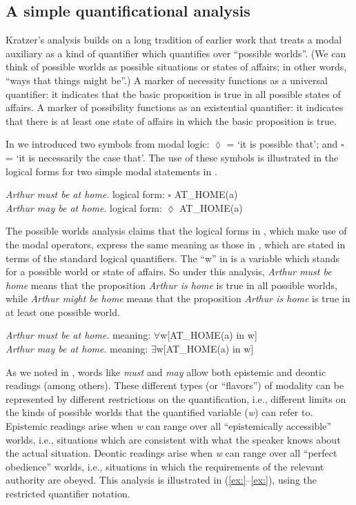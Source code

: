 \subsection{A simple quantificational analysis}\label{sec:16.3.1}

Kratzer’s analysis builds on a long tradition of earlier work that treats a modal auxiliary as a kind of quantifier which quantifies over “possible worlds”. (We can think of possible worlds as possible situations or states of affairs; in other words, “ways that things might be”.) A marker of necessity functions as a universal quantifier: it indicates that the basic proposition is true in all possible states of affairs. A marker of possibility functions as an existential quantifier: it indicates that there is at least one state of affairs in which the basic proposition is true.



In  we introduced two symbols from modal logic: ${\lozenge}$ = ‘it is possible that’; and ${\square}$ = ‘it is necessarily the case that’. The use of these symbols is illustrated in the logical forms for two simple modal statements in .


\ea
\ea \textit{Arthur must be at home}.  logical form: ${\square}$ AT\_HOME(a)\\
\ex \textit{Arthur may be at home}.  logical form: ${\lozenge}$ AT\_HOME(a)
                       \z
\z


The possible worlds analysis claims that the logical forms in , which make use of the modal operators, express the same meaning as those in , which are stated in terms of the standard logical quantifiers. The “w” in  is a variable which stands for a possible world or state of affairs. So under this analysis, \textit{Arthur must be home} means that the proposition \textit{Arthur is home} is true in all possible worlds, while \textit{Arthur might be home} means that the proposition \textit{Arthur is home} is true in at least one possible world.


\ea
\ea \textit{Arthur must be at home}.  meaning: ${\forall}$w[AT\_HOME(a) in w]\\
\ex \textit{Arthur may be at home}.  meaning: ${\exists}$w[AT\_HOME(a) in w]
                       \z
\z


As we noted in , words like \textit{must} and \textit{may} allow both epistemic and deontic readings (among others). These different types (or “flavors”) of modality can be represented by different restrictions on the quantification, i.e., different limits on the kinds of possible worlds that the quantified variable (\textit{w}) can refer to. Epistemic readings arise when \textit{w} can range over all “epistemically accessible” worlds, i.e., situations which are consistent with what the speaker knows about the actual situation. Deontic readings arise when \textit{w} can range over all “perfect obedience” worlds, i.e., situations in which the requirements of the relevant authority are obeyed. This analysis is illustrated in (\ref{ex:}--\ref{ex:}), using the restricted quantifier notation.


